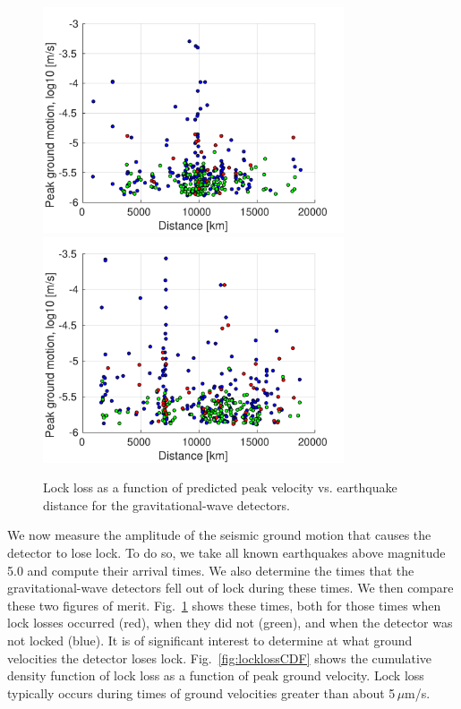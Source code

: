 \documentclass[reprint, prl, aps, showpacs]{revtex4-1}
\begin{document}
\begin{figure}[t]
\hspace*{-0.5cm}
 \includegraphics[width=3.5in]{lockloss_vel_distance_LHO.pdf}
  \includegraphics[width=3.5in]{lockloss_vel_distance_LLO.pdf}
 \caption{Lock loss as a function of predicted peak velocity vs. earthquake distance for the gravitational-wave detectors.}
 \label{fig:lockloss}
\end{figure}

We now measure the amplitude of the seismic ground motion that causes the detector to lose lock. To do so, we take all known earthquakes above magnitude 5.0 and compute their arrival times. 
We also determine the times that the gravitational-wave detectors fell out of lock during these times. 
We then compare these two figures of merit. 
Fig.~\ref{fig:lockloss} shows these times, both for those times when lock losses occurred (red), when they did not (green), and when the detector was not locked (blue). 
It is of significant interest to determine at what ground velocities the detector loses lock.
Fig.~\ref{fig:locklossCDF} shows the cumulative density function of lock loss as a function of peak ground velocity.
Lock loss typically occurs during times of ground velocities greater than about 5\,$\mu$m/s.
\end{document}
